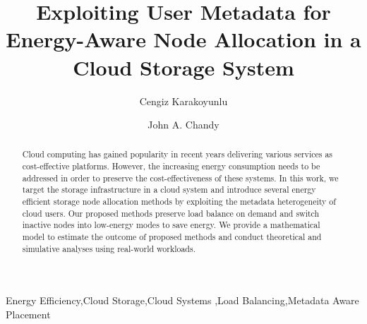 \documentclass[preprint,12pt]{elsarticle}
\begin{document}
\begin{frontmatter}



\title{Exploiting User Metadata for Energy-Aware Node Allocation in a Cloud Storage System}


\author{Cengiz Karakoyunlu}
\author{John A. Chandy}

\address{Department of Electrical and Computer Engineering, University of Connecticut, Storrs, CT, 06269}


\begin{abstract}
Cloud computing has gained popularity in recent years delivering
various services as cost-effective platforms. However, the increasing
energy consumption needs to be addressed in order to preserve the
cost-effectiveness of these systems. In this work, we target the
storage infrastructure in a cloud system and introduce several energy
efficient storage node allocation methods by exploiting the metadata
heterogeneity of cloud users. Our proposed methods preserve load balance
on demand and switch inactive nodes into low-energy modes to save energy.
We provide a mathematical model to estimate the outcome of proposed methods
and conduct theoretical and simulative analyses using real-world workloads.

\end{abstract}

\begin{keyword}
Energy Efficiency\sep Cloud Storage\sep Cloud Systems
\sep Load Balancing\sep Metadata Aware Placement



\end{keyword}

\end{frontmatter}
\end{document}
